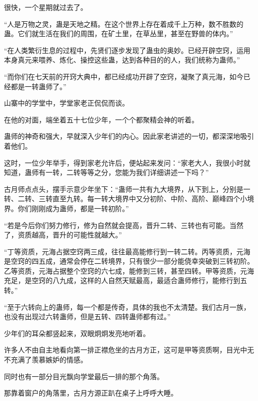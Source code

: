 
\begin{this_body}



很快，一个星期就过去了。

“人是万物之灵，蛊是天地之精。在这个世界上存在着成千上万种，数不胜数的蛊。它们就生活在我们的周围，在矿土里，在草丛里，甚至在野兽的体内。”

“在人类繁衍生息的过程中，先贤们逐步发现了蛊虫的奥妙。已经开辟空窍，运用本身真元来喂养、炼化、操控这些蛊，达到各种目的的人，我们统称为蛊师。”

“而你们在七天前的开窍大典中，都已经成功开辟了空窍，凝聚了真元海，如今已经都是一转蛊师了。”

山寨中的学堂中，学堂家老正侃侃而谈。

在他的对面，端坐着五十七位少年，一个个都聚精会神的听着。

蛊师的神奇和强大，早就深入少年们的内心。因此家老讲述的一切，都深深地吸引着他们。

这时，一位少年举手，得到家老允许后，便站起来发问：“家老大人，我很小时就知道，蛊师有一转，二转等等之分，您能为我们详细讲述一下吗？”

古月师点点头，摆手示意少年坐下：“蛊师一共有九大境界，从下到上，分别是一转、二转、三转直至九转。每一转大境界中又分初阶、中阶、高阶、巅峰四个小境界。你们刚刚成为蛊师，都是一转初阶。”

“若是今后你们努力修行，修为自然就会提高，晋升二转、三转也有可能。当然了，资质越高，晋升的可能性就越大。”

“丁等资质，元海占据空窍两三成，往往最高能修行到一转二转。丙等资质，元海是空窍的四五成，通常会停在二转境界，只有很少一部分能侥幸突破到三转初阶。乙等资质，元海占据整个空窍的六七成，能修到三转，甚至四转。甲等资质，元海充足，是空窍的八九成，这样的人自然天赋最高，最适合蛊师修行，能修行到五转。”

“至于六转向上的蛊师，每一个都是传奇，具体的我也不太清楚。我们古月一族，也没有出现过六转蛊师，但是五转、四转蛊师都有过。”

少年们的耳朵都竖起来，双眼炯炯发亮地听着。

许多人不由自主地看向第一排正襟危坐的古月方正，这可是甲等资质啊，目光中无不充满了羡慕嫉妒的情感。

同时也有一部分目光飘向学堂最后一排的那个角落。

那靠着窗户的角落里，古月方源正趴在桌子上呼呼大睡。


\end{this_body}
